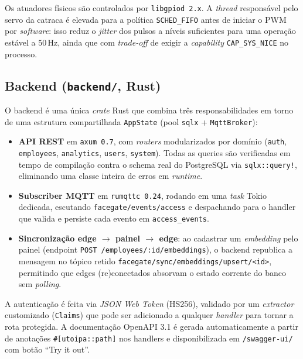 \documentclass[12pt,a4paper]{report}
\begin{document}
Os atuadores físicos são controlados por \texttt{libgpiod\,2.x}. A
\textit{thread} responsável pelo servo da catraca é elevada para a
política \texttt{SCHED\_FIFO} antes de iniciar o PWM por
\textit{software}: isso reduz o \textit{jitter} dos pulsos a níveis
suficientes para uma operação estável a 50\,Hz, ainda que com
\textit{trade-off} de exigir a \textit{capability} \texttt{CAP\_SYS\_NICE}
no processo.

\subsection{Backend (\texttt{backend/}, Rust)}

O backend é uma única \textit{crate} Rust que combina três
responsabilidades em torno de uma estrutura compartilhada
\texttt{AppState} (pool \texttt{sqlx} + \texttt{MqttBroker}):

\begin{itemize}
    \item \textbf{API REST} em \texttt{axum 0.7}, com \textit{routers}
        modularizados por domínio (\texttt{auth}, \texttt{employees},
        \texttt{analytics}, \texttt{users}, \texttt{system}). Todas as
        queries são verificadas em tempo de compilação contra o schema
        real do PostgreSQL via \texttt{sqlx::query!}, eliminando uma
        classe inteira de erros em \textit{runtime}.
    \item \textbf{Subscriber MQTT} em \texttt{rumqttc 0.24}, rodando em
        uma \textit{task} Tokio dedicada, escutando
        \texttt{facegate/events/access} e despachando para o handler
        que valida e persiste cada evento em \texttt{access\_events}.
    \item \textbf{Sincronização edge $\rightarrow$ painel $\rightarrow$
        edge}: ao cadastrar um \textit{embedding} pelo painel
        (endpoint \texttt{POST /employees/:id/embeddings}), o backend
        republica a mensagem no tópico retido
        \texttt{facegate/sync/embeddings/upsert/<id>}, permitindo que
        edges (re)conectados absorvam o estado corrente do banco sem
        \textit{polling}.
\end{itemize}

A autenticação é feita via \textit{JSON Web Token} (HS256), validado
por um \textit{extractor} customizado (\texttt{Claims}) que pode ser
adicionado a qualquer \textit{handler} para tornar a rota protegida.
A documentação OpenAPI 3.1 é gerada automaticamente a partir de
anotações \texttt{\#[utoipa::path]} nos handlers e disponibilizada em
\texttt{/swagger-ui/} com botão ``Try it out''.
\end{document}
